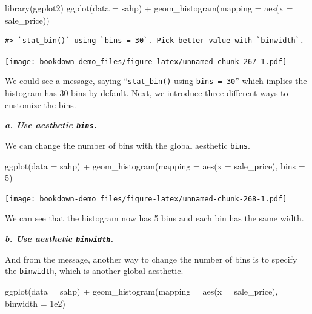 \documentclass[
]{book}
\newenvironment{Shaded}{\begin{snugshade}}{\end{snugshade}}
\newcommand{\AttributeTok}[1]{\textcolor[rgb]{0.77,0.63,0.00}{#1}}
\newcommand{\DecValTok}[1]{\textcolor[rgb]{0.00,0.00,0.81}{#1}}
\newcommand{\FloatTok}[1]{\textcolor[rgb]{0.00,0.00,0.81}{#1}}
\newcommand{\FunctionTok}[1]{\textcolor[rgb]{0.00,0.00,0.00}{#1}}
\newcommand{\NormalTok}[1]{#1}
\newcommand{\SpecialCharTok}[1]{\textcolor[rgb]{0.00,0.00,0.00}{#1}}
\begin{document}
\begin{Shaded}
\begin{Highlighting}[]
\FunctionTok{library}\NormalTok{(ggplot2)}
\FunctionTok{ggplot}\NormalTok{(}\AttributeTok{data =}\NormalTok{ sahp) }\SpecialCharTok{+} \FunctionTok{geom\_histogram}\NormalTok{(}\AttributeTok{mapping =} \FunctionTok{aes}\NormalTok{(}\AttributeTok{x =}\NormalTok{ sale\_price))}
\end{Highlighting}
\end{Shaded}

\begin{verbatim}
#> `stat_bin()` using `bins = 30`. Pick better value with `binwidth`.
\end{verbatim}

\texttt{[image: bookdown-demo\_files/figure-latex/unnamed-chunk-267-1.pdf]}

We could see a message, saying ``\texttt{stat\_bin()} using \texttt{bins\ =\ 30}'' which implies the histogram has 30 bins by default. Next, we introduce three different ways to customize the bins.

\textbf{\emph{a. Use aesthetic \texttt{bins}.}}

We can change the number of bins with the global aesthetic \texttt{bins}.

\begin{Shaded}
\begin{Highlighting}[]
\FunctionTok{ggplot}\NormalTok{(}\AttributeTok{data =}\NormalTok{ sahp) }\SpecialCharTok{+} \FunctionTok{geom\_histogram}\NormalTok{(}\AttributeTok{mapping =} \FunctionTok{aes}\NormalTok{(}\AttributeTok{x =}\NormalTok{ sale\_price), }\AttributeTok{bins =} \DecValTok{5}\NormalTok{)}
\end{Highlighting}
\end{Shaded}

\texttt{[image: bookdown-demo\_files/figure-latex/unnamed-chunk-268-1.pdf]}

We can see that the histogram now has 5 bins and each bin has the same width.

\textbf{\emph{b. Use aesthetic \texttt{binwidth}.}}

And from the message, another way to change the number of bins is to specify the \texttt{binwidth}, which is another global aesthetic.

\begin{Shaded}
\begin{Highlighting}[]
\FunctionTok{ggplot}\NormalTok{(}\AttributeTok{data =}\NormalTok{ sahp) }\SpecialCharTok{+} \FunctionTok{geom\_histogram}\NormalTok{(}\AttributeTok{mapping =} \FunctionTok{aes}\NormalTok{(}\AttributeTok{x =}\NormalTok{ sale\_price), }\AttributeTok{binwidth =} \FloatTok{1e2}\NormalTok{)}
\end{Highlighting}
\end{Shaded}
\end{document}

